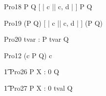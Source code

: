 \begin{circus}
    \circprocess Pro18 \circdef P \circtimedinterrupt {} \rcirctime Q [ | \lchanset c \rchanset || \lchanset c, d \rchanset | ] P \circtimedinterrupt {} \rcirctime Q \\
\end{circus}
 
\begin{circus}
    \circprocess Pro19 \circdef (P \circtimedinterrupt {} \rcirctime Q) [ | \lchanset c \rchanset || \lchanset c, d \rchanset | ] (P \circtimedinterrupt {} \rcirctime Q) \\
\end{circus}



\begin{circus}
    \circprocess Pro20 \circdef \circvres tvar : \nat  \circspot P \circtimedinterrupt \lcirctime tvar \rcirctime Q\\
\end{circus}   


\begin{circus}
    \circprocess Pro12 \circdef (c \then P \circtimedinterrupt {} \rcirctime Q) \circhide c \\
\end{circus} 
     
\begin{circus}
    \t1 Pro26 \circdef P \circtimedinterrupt \lcirctime X : 0  \rcirctime Q\\
\end{circus}        

\begin{circus}
    \t1 Pro27 \circdef P \circtimedinterrupt \lcirctime X : 0 \upto tval \rcirctime Q \\
\end{circus} 
